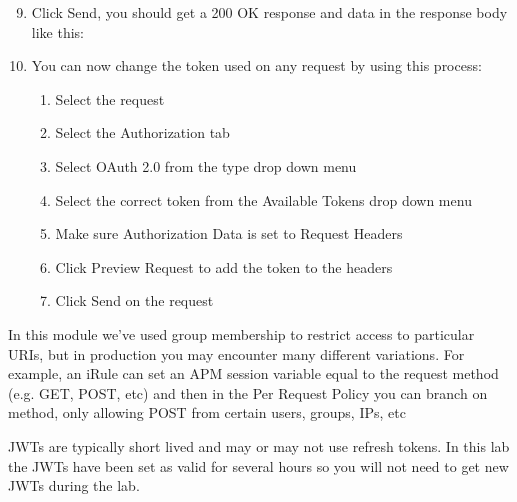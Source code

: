 \documentclass[letterpaper,10pt,english]{sphinxmanual}
\begin{document}
\begin{quote}

\noindent{}
\end{quote}
\begin{enumerate}
\setcounter{enumi}{8}
\item {} 
Click Send, you should get a 200 OK response and data in the
response body like this:

\end{enumerate}
\begin{quote}

\noindent{}
\end{quote}
\begin{enumerate}
\setcounter{enumi}{9}
\item {} 
You can now change the token used on any request by using this
process:
\begin{enumerate}
\item {} 
Select the request

\item {} 
Select the Authorization tab

\item {} 
Select OAuth 2.0 from the type drop down menu

\item {} 
Select the correct token from the Available Tokens drop down menu

\item {} 
Make sure Authorization Data is set to Request Headers

\item {} 
Click Preview Request to add the token to the headers

\item {} 
Click Send on the request

\end{enumerate}

\end{enumerate}

In this module we’ve used group membership to restrict access to
particular URIs, but in production you may encounter many different
variations. For example, an iRule can set an APM session variable equal
to the request method (e.g. GET, POST, etc) and then in the Per Request
Policy you can branch on method, only allowing POST from certain users,
groups, IPs, etc

JWTs are typically short lived and may or may not use refresh tokens. In
this lab the JWTs have been set as valid for several hours so you will
not need to get new JWTs during the lab.
\end{document}
